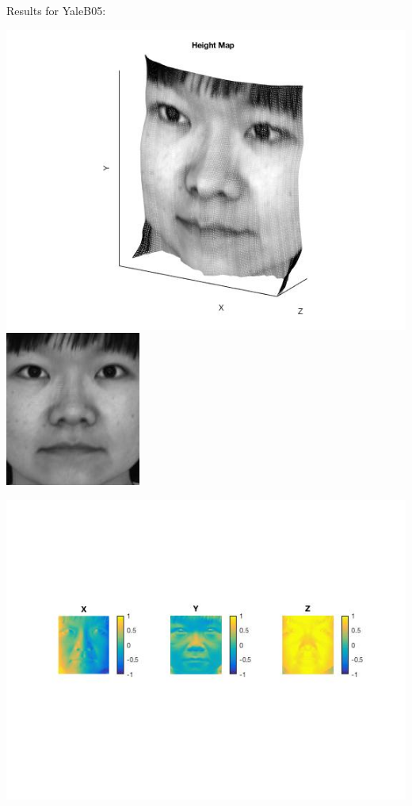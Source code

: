 \documentclass[fleqn]{article}
\begin{document}
\newpage

Results for YaleB05:
 
\vspace{10 mm}
\includegraphics{yaleB05.jpg}
\newpage
\includegraphics{yaleB05_albedo.jpg}

\includegraphics{a5.jpg}
\end{document}
